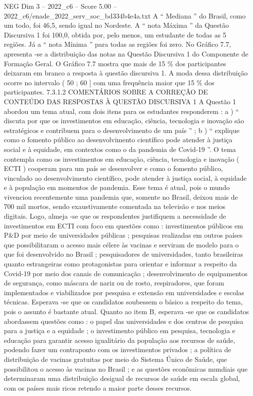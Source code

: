 \begin{textsample}{NEG Dim 3 – 2022\_c6 – Score 5.00 – 2022\_c6/enade\_2022\_serv\_soc\_bd334b4e4a.txt}
A “ Mediana ” do Brasil, como um todo, foi 46,5, sendo igual no Nordeste.
A “ nota Máxima ” da Questão Discursiva 1 foi 100,0, obtida por, pelo menos, um estudante de todas as 5 regiões.
Já a “ nota Mínima ” para todas as regiões foi zero.
No Gráfico 7.7, apresenta -se a distribuição das notas na Questão Discursiva 1 do Componente de Formação Geral.
O Gráfico 7.7 mostra que mais de 15 \% dos participantes deixaram em branco a resposta à questão discursiva 1.
A moda dessa distribuição ocorre no intervalo ( 50 ; 60 ] com uma frequência maior que 15 \% dos participantes. 7.3.1.2 COMENTÁRIOS SOBRE A CORREÇÃO DE CONTEÚDO DAS RESPOSTAS À QUESTÃO DISCURSIVA 1 A Questão 1 abordou um tema atual, com dois itens para os estudantes responderem : a ) “ discuta por que os investimentos em educação, ciência, tecnologia e inovação são estratégicos e contribuem para o desenvolvimento de um país ” ; b ) “ explique como o fomento público ao desenvolvimento científico pode atender à justiça social e à equidade, em contextos como o da pandemia de Covid-19 ”.
O tema contempla como os investimentos em educação, ciência, tecnologia e inovação ( ECTI ) cooperam para um país se desenvolver e como o fomento público, vinculado ao desenvolvimento científico, pode atender à justiça social, à equidade e à população em momentos de pandemia.
Esse tema é atual, pois o mundo vivenciou recentemente uma pandemia que, somente no Brasil, deixou mais de 700 mil mortos, sendo exaustivamente comentada na televisão e nos meios digitais.
Logo, almeja -se que os respondentes justifiquem a necessidade de investimentos em ECTI com foco em questões como : investimentos públicos em P\&D por meio de universidades públicas ; pesquisas realizadas em outros países que possibilitaram o acesso mais célere às vacinas e serviram de modelo para o que foi desenvolvido no Brasil ; pesquisadores de universidades, tanto brasileiras quanto estrangeiras como protagonistas para orientar e informar a respeito da Covid-19 por meio dos canais de comunicação ; desenvolvimento de equipamentos de segurança, como máscara de nariz ou de rosto, respiradores, que foram implementados e viabilizados por pesquisa e extensão em universidades e escolas técnicas.
Esperava -se que os candidatos soubessem o básico a respeito do tema, pois o assunto é bastante atual.
Quanto ao item B, esperava -se que os candidatos abordassem questões como : o papel das universidades e dos centros de pesquisa para a justiça e a equidade ; o investimento público em pesquisa, tecnologia e educação para garantir acesso igualitário da população aos recursos de saúde, podendo fazer um contraponto com os investimentos privados ; a política de distribuição de vacinas gratuitas por meio do Sistema Único de Saúde, que possibilitou o acesso às vacinas no Brasil ; e as questões econômicas mundiais que determinaram uma distribuição desigual de recursos de saúde em escala global, com os países mais ricos retendo a maior parte desses recursos.

\end{textsample}
